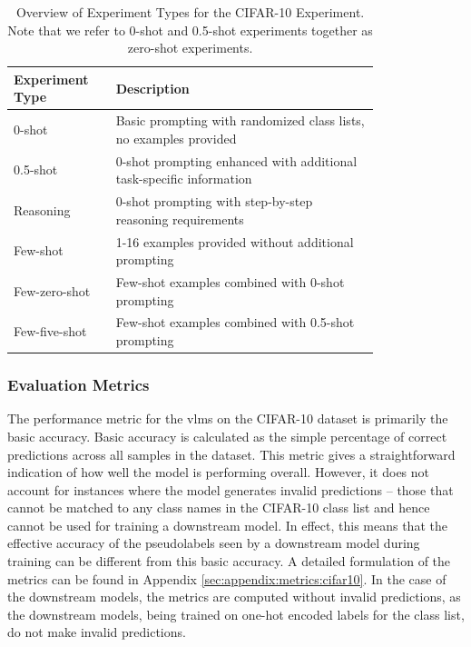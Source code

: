 \documentclass[../ShajiS_RnDReport.tex]{subfiles}
\begin{document}
\begin{table}[ht]
    \centering
    \begin{tabular}{p{0.2\linewidth}p{0.6\linewidth}}
        \hline
        \textbf{Experiment Type} & \textbf{Description} \\
        \hline
        0-shot & Basic prompting with randomized class lists, no examples provided \\
        0.5-shot & 0-shot prompting enhanced with additional task-specific information \\
        Reasoning & 0-shot prompting with step-by-step reasoning requirements \\
        Few-shot & 1-16 examples provided without additional prompting \\
        Few-zero-shot & Few-shot examples combined with 0-shot prompting \\
        Few-five-shot & Few-shot examples combined with 0.5-shot prompting \\
        \hline
    \end{tabular}
    \caption{Overview of Experiment Types for the CIFAR-10 Experiment. Note that we refer to 0-shot and 0.5-shot experiments together as zero-shot experiments.}
    \label{tab:cifar_experiment_types}
\end{table}

\subsubsection{Evaluation Metrics}
The performance metric for the \glspl{vlm} on the CIFAR-10 dataset is primarily the basic accuracy. Basic accuracy is calculated as the simple percentage of correct predictions across all samples in the dataset. This metric gives a straightforward indication of how well the model is performing overall. However, it does not account for instances where the model generates invalid predictions -- those that cannot be matched to any class names in the CIFAR-10 class list and hence cannot be used for training a downstream model. In effect, this means that the effective accuracy of the pseudolabels seen by a downstream model during training can be different from this basic accuracy. A detailed formulation of the metrics can be found in Appendix \ref{sec:appendix:metrics:cifar10}. In the case of the downstream models, the metrics are computed without invalid predictions, as the downstream models, being trained on one-hot encoded labels for the class list, do not make invalid predictions.
\end{document}
